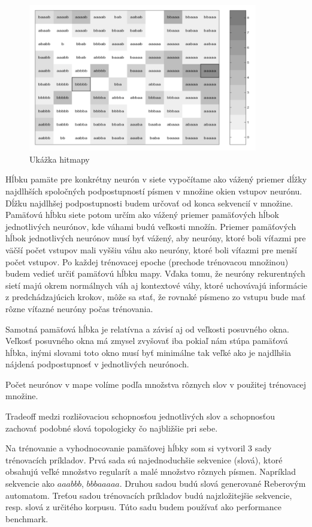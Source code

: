 \begin{figure}[H]
	\centering
	\includegraphics[width=10cm]{assets/receptive_field}
	\caption{Ukážka hitmapy}
\end{figure}

Hĺbku pamäte pre konkrétny neurón v siete vypočítame ako vážený priemer dĺžky najdlhších spoločných 
podpostupností písmen v množine okien vstupov neurónu.
Dĺžku najdlhšej podpostupnosti budem určovať od konca sekvencií v množine. 
Pamäťovú hĺbku siete potom určím ako vážený priemer pamäťových hĺbok jednotlivých neurónov, kde váhami budú veľkosti
množín.
Priemer pamäťových hĺbok jednotlivých neurónov musí byť vážený, aby neuróny, 
ktoré boli víťazmi pre väčší počet vstupov mali vyššiu váhu ako neuróny, ktoré boli víťazmi pre menší počet vstupov.
Po každej trénovacej epoche (prechode trénovacou množinou) budem vedieť určiť pamäťovú hĺbku mapy.
Vďaka tomu, že neuróny rekurentných sietí majú okrem normálnych váh aj kontextové váhy, 
ktoré uchovávajú informácie z predchádzajúcich krokov, môže sa stať, že rovnaké písmeno zo vstupu 
bude mať rôzne víťazné neuróny počas trénovania.


Samotná pamäťová hĺbka je relatívna a závisí aj od veľkosti posuvného okna.
Veľkosť posuvného okna má zmysel zvyšovať iba pokiaľ nám stúpa pamäťová hĺbka, inými
slovami toto okno musí byť minimálne tak veľké ako je najdlhšia nájdená podpostupnosť v jednotlivých neurónoch.

Počet neurónov v mape volíme podľa množstva rôznych slov v použitej trénovacej
množine.

Tradeoff medzi rozlišovaciou schopnosťou jednotlivých slov a schopnosťou
zachovať podobné slová topologicky čo najbližšie pri sebe.

Na trénovanie a vyhodnocovanie pamäťovej hĺbky som si vytvoril 3 sady 
trénovacích príkladov. 
Prvá sada sú najednoduchšie sekvenice (slová), ktoré obsahujú veľké množstvo regularít a malé množstvo rôznych písmen.
Napríklad sekvencie ako $aaabbb$,  $bbbaaaaa$.
Druhou sadou budú slová generované Reberovým automatom.
Treťou sadou trénovacích príkladov budú najzložitejšie sekvencie, resp. slová z určitého korpusu. 
Túto sadu budem používať ako performance benchmark. 

